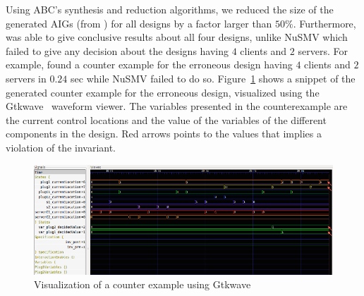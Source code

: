 Using ABC's synthesis and reduction algorithms, we reduced the size of the generated AIGs (from \biptool{})  for all designs by a factor larger than $50\%$. Furthermore,
\biptool{} was able to give conclusive results about all four designs, unlike
NuSMV which failed to give any decision about the designs having
$4$ clients and $2$ servers. For example, \biptool{} found a counter example for the erroneous 
design having $4$ clients and $2$ servers in $0.24$ sec while NuSMV failed to do so.
Figure~\ref{fig:res:counter} shows a snippet of the generated counter example for the erroneous design, visualized using the Gtkwave~\cite{bybell2010gtkwave} waveform viewer. 
The variables presented in the counterexample are the current control locations and the value of the variables of the different components in the design. Red arrows points to the values that implies a violation of the invariant. 
%
\begin{figure}
\centering
 \includegraphics[width=\linewidth]{figures/quorumDebug2}
\caption{Visualization of a counter example using Gtkwave}
\label{fig:res:counter}
\end{figure}
%
